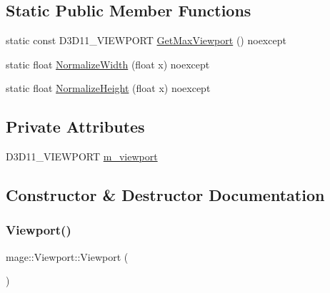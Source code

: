 \subsection*{Static Public Member Functions}
\begin{DoxyCompactItemize}
\item 
static const D3\+D11\+\_\+\+V\+I\+E\+W\+P\+O\+RT \hyperlink{structmage_1_1_viewport_aec4a434cbb6f68805d02f1be6ecbf5a8}{Get\+Max\+Viewport} () noexcept
\item 
static float \hyperlink{structmage_1_1_viewport_ab567840619b22662a66f838f454bb25d}{Normalize\+Width} (float x) noexcept
\item 
static float \hyperlink{structmage_1_1_viewport_a5dd77b43f7d40cdb9efa6896691ed1d5}{Normalize\+Height} (float x) noexcept
\end{DoxyCompactItemize}
\subsection*{Private Attributes}
\begin{DoxyCompactItemize}
\item 
D3\+D11\+\_\+\+V\+I\+E\+W\+P\+O\+RT \hyperlink{structmage_1_1_viewport_a9509003aae2c6cd0f33cfc875cd235f4}{m\+\_\+viewport}
\end{DoxyCompactItemize}


\subsection{Constructor \& Destructor Documentation}
\hypertarget{structmage_1_1_viewport_ab189482e477d46a63c514f59e09ca31b}{}\label{structmage_1_1_viewport_ab189482e477d46a63c514f59e09ca31b} 
\subsubsection{\texorpdfstring{Viewport()}{Viewport()}\hspace{0.1cm}{\footnotesize\ttfamily [1/5]}}
{\footnotesize\ttfamily mage\+::\+Viewport\+::\+Viewport (\begin{DoxyParamCaption}{ }\end{DoxyParamCaption})}

\hypertarget{structmage_1_1_viewport_a30e0141573acb18a4f8b1ef0aa46c8e0}{}\label{structmage_1_1_viewport_a30e0141573acb18a4f8b1ef0aa46c8e0} 
